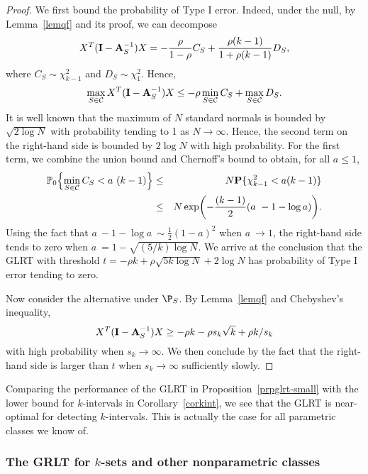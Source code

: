 \documentclass[10pt, oneside]{article}
\begin{document}
\begin{proof}
We first bound the probability of Type I error. Indeed, under the null,
by Lemma~\ref{lemqf} and its proof, we can decompose
%
\[
X^T (\mathbf{I}- \mathbf{A}_S^{-1}) X
= -\frac\rho{1-\rho} C_S + \frac{\rho(k-1)}{1 + \rho(k-1)} D_S,
\]
%
where $C_S \sim\chi_{k-1}^2$ and $D_S \sim\chi_1^2$. Hence,
%
\[
\max_{S \in{\mathcal C}} X^T (\mathbf{I}- \mathbf{A}_S^{-1}) X \leq-\rho\min_{S \in
{\mathcal C}} C_S + \max_{S \in{\mathcal C}} D_S.
\]
%
It is well known that the maximum of $N$ standard normals is bounded
by
$\sqrt{2 \log N}$
with probability tending to 1 as $N \to
\infty$. Hence, the second term on the right-hand side is bounded by
$2 \log N$ with high probability. For the first term, we combine the
union bound and Chernoff's bound to obtain, for all $a\le1$,
%
\begin{eqnarray}\label{glrt-small-eq1}
\mathbb{P}_0\Bigl\{\min_{S \in{\mathcal C}} C_S < a~(k-1)\Bigr\}
&\leq& N \mathbf{P}\{\chi_{k-1}^2 < a(k-1)\} \nonumber\\[-8pt]\\[-8pt]
&\leq& N \exp\biggl(-\frac{(k-1)}2 (a~- 1 - \log a)\biggr).
\nonumber
\end{eqnarray}
%
Using the fact that $a~- 1 - \log a~\sim\frac12 (1-a)^2$ when $a~\to
1$, the right-hand side tends to zero when $a~= 1 - \sqrt{(5/k)\log
N}$. We arrive at the conclusion that the GLRT with threshold $t =
- \rho k + \rho\sqrt{5 k \log N} + 2 \log N$ has probability of Type
I error tending to zero.

Now consider the alternative under $\P_S$. By Lemma~\ref{lemqf} and
Chebyshev's inequality,
%
\[
X^T (\mathbf{I}- \mathbf{A}_S^{-1}) X \geq- \rho k - \rho s_k \sqrt{k} + \rho k /s_k
\]
%
with high probability when $s_k \to\infty$. We then conclude by the
fact that the right-hand side is larger than $t$ when $s_k \to\infty$
sufficiently slowly.
\end{proof}

Comparing the performance of the GLRT in Proposition~\ref{prpglrt-small} with the
lower bound for $k$-intervals in Corollary~\ref{corkint}, we see that the
GLRT is near-optimal for detecting $k$-intervals. This is actually
the case for all parametric classes we know of.

\subsubsection{The GRLT for $k$-sets and other nonparametric classes}
\label{secglrt-nonparametric}
\end{document}
